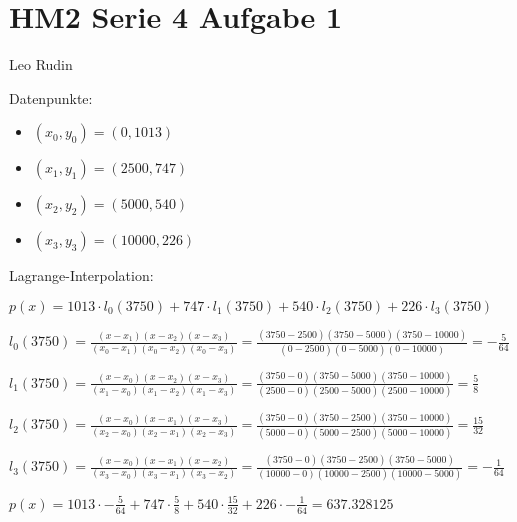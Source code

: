\documentclass{article}
\begin{document}
\section*{HM2 Serie 4 Aufgabe 1}
Leo Rudin

Datenpunkte:
\begin{itemize}
    \item \((x_0,y_0) = (0,1013)\)
    \item \((x_1,y_1) = (2500,747)\)
    \item \((x_2,y_2) = (5000,540)\)
    \item \((x_3,y_3) = (10000,226)\)
\end{itemize}

Lagrange-Interpolation:

\(p(x) = 1013 \cdot l_0(3750) + 747 \cdot l_1(3750) + 540 \cdot l_2(3750) + 226 \cdot l_3(3750)\)

\(l_0(3750) = \frac{(x-x_1)(x-x_2)(x-x_3)}{(x_0-x_1)(x_0-x_2)(x_0-x_3)} 
= \frac{(3750-2500)(3750-5000)(3750-10000)}{(0-2500)(0-5000)(0-10000)} = -\frac{5}{64}\)

\(l_1(3750) = \frac{(x-x_0)(x-x_2)(x-x_3)}{(x_1-x_0)(x_1-x_2)(x_1-x_3)}
= \frac{(3750-0)(3750-5000)(3750-10000)}{(2500-0)(2500-5000)(2500-10000)} = \frac{5}{8}\)

\(l_2(3750) = \frac{(x-x_0)(x-x_1)(x-x_3)}{(x_2-x_0)(x_2-x_1)(x_2-x_3)}
= \frac{(3750-0)(3750-2500)(3750-10000)}{(5000-0)(5000-2500)(5000-10000)} = \frac{15}{32}\)

\(l_3(3750) = \frac{(x-x_0)(x-x_1)(x-x_2)}{(x_3-x_0)(x_3-x_1)(x_3-x_2)}
= \frac{(3750-0)(3750-2500)(3750-5000)}{(10000-0)(10000-2500)(10000-5000)} = -\frac{1}{64}\)

\(p(x) = 1013 \cdot -\frac{5}{64} + 747 \cdot \frac{5}{8} + 540 \cdot \frac{15}{32} + 226 \cdot -\frac{1}{64} = 637.328125\)
\end{document}

